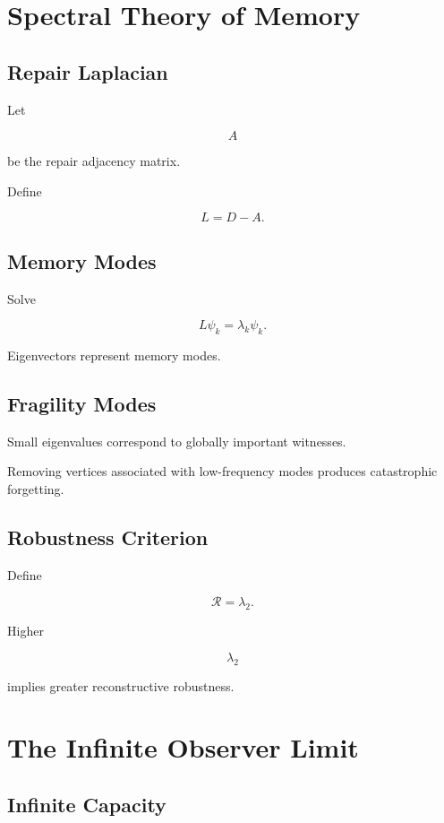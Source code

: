 \documentclass[12pt,oneside]{book}
\theoremstyle{plain} \newtheorem{theorem}{Theorem}[chapter] \newtheorem{lemma}[theorem]{Lemma} \newtheorem{proposition}[theorem]{Proposition} \newtheorem{corollary}[theorem]{Corollary}
\theoremstyle{definition} \newtheorem{definition}[theorem]{Definition} \newtheorem{axiom}[theorem]{Axiom} \newtheorem{construction}[theorem]{Construction}
\theoremstyle{remark} \newtheorem{remark}[theorem]{Remark} \newtheorem{example}[theorem]{Example}
\begin{document}
\chapter{Spectral Theory of Memory}

\section{Repair Laplacian}

Let

\[
A
\]

be the repair adjacency matrix.

Define

\[
L=D-A.
\]

\section{Memory Modes}

Solve

\[
L\psi_k
=
\lambda_k\psi_k.
\]

Eigenvectors represent memory modes.

\section{Fragility Modes}

Small eigenvalues correspond to globally important witnesses.

Removing vertices associated with low-frequency modes produces catastrophic forgetting.

\section{Robustness Criterion}

Define

\[
\mathcal R
=
\lambda_2.
\]

Higher

\[
\lambda_2
\]

implies greater reconstructive robustness.

\chapter{The Infinite Observer Limit}

\section{Infinite Capacity}
\end{document}
